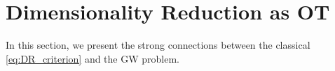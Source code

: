 

\section{Dimensionality Reduction as OT}\label{sec:DR_as_OT}


In this section, we present the strong connections between the classical \cref{eq:DR_criterion} and the GW problem.



